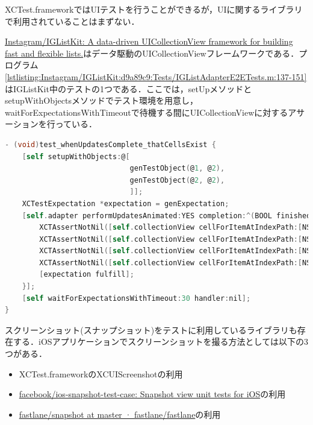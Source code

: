 XCTest.frameworkではUIテストを行うことができるが，UIに関するライブラリで利用されていることはまずない．

\href{https://github.com/Instagram/IGListKit}{Instagram/IGListKit: A data-driven UICollectionView framework for building fast and flexible lists.}はデータ駆動のUICollectionViewフレームワークである．プログラム\ref{lstlisting:Instagram/IGListKit:d9a89c9:Tests/IGListAdapterE2ETests.m:137-151}はIGListKit中のテストの1つである．ここでは，{\sf setUp}メソッドと{\sf setupWithObjects}メソッドでテスト環境を用意し，{\sf waitForExpectationsWithTimeout}で待機する間に{\sf UICollectionView}に対するアサーションを行っている．

\begin{lstlisting}[language=objectivec,caption=\href{https://github.com/Instagram/IGListKit/blob/d9a89c9b00aa1a9537a24d9affb6919f83065f65/Tests/IGListAdapterE2ETests.m}{UIライブラリにおけるアサーションを用いたテスト},label=lstlisting:Instagram/IGListKit:d9a89c9:Tests/IGListAdapterE2ETests.m:137-151,firstnumber=137]
- (void)test_whenUpdatesComplete_thatCellsExist {
    [self setupWithObjects:@[
                             genTestObject(@1, @2),
                             genTestObject(@2, @2),
                             ]];
    XCTestExpectation *expectation = genExpectation;
    [self.adapter performUpdatesAnimated:YES completion:^(BOOL finished) {
        XCTAssertNotNil([self.collectionView cellForItemAtIndexPath:[NSIndexPath indexPathForItem:0 inSection:0]]);
        XCTAssertNotNil([self.collectionView cellForItemAtIndexPath:[NSIndexPath indexPathForItem:1 inSection:0]]);
        XCTAssertNotNil([self.collectionView cellForItemAtIndexPath:[NSIndexPath indexPathForItem:0 inSection:1]]);
        XCTAssertNotNil([self.collectionView cellForItemAtIndexPath:[NSIndexPath indexPathForItem:1 inSection:1]]);
        [expectation fulfill];
    }];
    [self waitForExpectationsWithTimeout:30 handler:nil];
}
\end{lstlisting}

スクリーンショット(スナップショット)をテストに利用しているライブラリも存在する．iOSアプリケーションでスクリーンショットを撮る方法としては以下の3つがある．

\begin{itemize}
    \item XCTest.frameworkの{\sf XCUIScreenshot}の利用
    \item \href{https://github.com/facebook/ios-snapshot-test-case}{facebook/ios-snapshot-test-case: Snapshot view unit tests for iOS}の利用
    \item \href{https://github.com/fastlane/fastlane/tree/master/snapshot}{fastlane/snapshot at master · fastlane/fastlane}の利用
\end{itemize}

